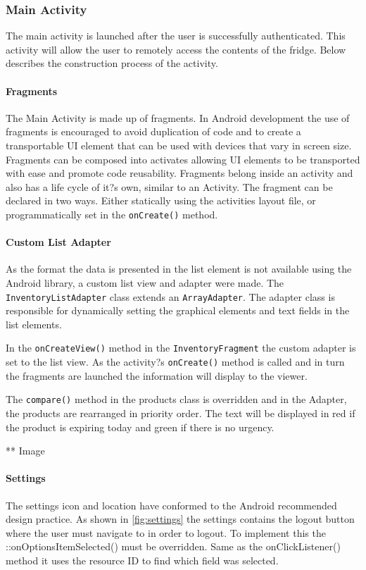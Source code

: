 \documentclass[a4paper, 11pt]{article}
\begin{document}
\subsubsection{Main Activity}
The main activity is launched after the user is successfully authenticated. This activity will allow the user to remotely access the contents of the fridge. Below describes the construction process of the activity. 

\paragraph{Fragments} The Main Activity is made up of fragments. In Android development the use of fragments is encouraged to avoid duplication of code and to create a transportable UI element that can be used with devices that vary in screen size. Fragments can be composed into activates allowing UI elements to be transported with ease and promote code reusability. Fragments belong inside an activity and also has a life cycle of it?s own, similar to an Activity. The fragment can be declared in two ways. Either statically using the activities layout file, or programmatically set in the \texttt{onCreate()} method.  	

\paragraph{Custom List Adapter} 
As the format the data is presented in the list element is not available using the Android library, a custom list view and adapter were made. The \texttt{InventoryListAdapter} class extends an \texttt{ArrayAdapter}. The adapter class is responsible for dynamically setting the graphical elements and text fields in the list elements. 

 In the \texttt {onCreateView()} method in the \texttt{InventoryFragment} the custom adapter is set to the list view. As the activity?s \texttt{onCreate()} method is called and in turn the fragments are launched the information will display to the viewer. 

The \texttt{compare()} method in the products class is overridden and in the Adapter, the products are rearranged in priority order. The text will be displayed in red if the product is expiring today and green if there is no urgency. 

** Image 

\paragraph{Settings} 
The settings icon and location have conformed to the Android recommended design practice. As shown in \ref{fig:settings} the settings contains the logout button where the user must navigate to in order to logout. To implement this the ::onOptionsItemSelected() must be overridden. Same as the onClickListener() method it uses the resource ID to find which field was selected. 
 
\end{document}
